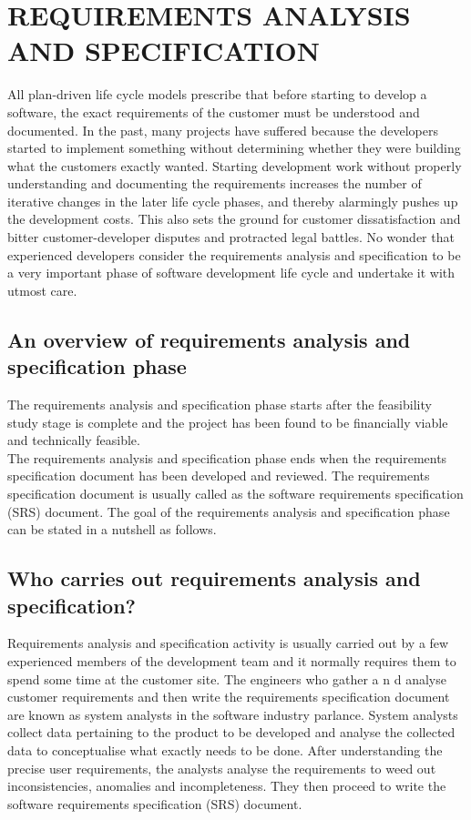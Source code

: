 \documentclass[12pt]{article}
\begin{document}
\section{REQUIREMENTS ANALYSIS AND SPECIFICATION}
All plan-driven life cycle models prescribe that before starting to develop a
software, the exact requirements of the customer must be understood and
documented. In the past, many projects have suffered because the
developers started to implement something without determining whether
they were building what the customers exactly wanted. Starting development
work without properly understanding and documenting the requirements
increases the number of iterative changes in the later life cycle phases, and
thereby alarmingly pushes up the development costs. This also sets the
ground for customer dissatisfaction and bitter customer-developer disputes
and protracted legal battles. No wonder that experienced developers consider
the requirements analysis and specification to be a very important phase of
software development life cycle and undertake it with utmost care.
\subsection{An overview of requirements analysis and specification
phase}
The requirements analysis and specification phase starts after the
feasibility study stage is complete and the project has been found to be
financially viable and technically feasible.\\

The requirements analysis and specification phase ends when the
requirements specification document has been developed and reviewed. The
requirements specification document is usually called as the software
requirements specification (SRS) document. The goal of the requirements
analysis and specification phase can be stated in a nutshell as follows.
\subsection{Who carries out requirements analysis and specification?}
Requirements analysis and specification activity is usually carried out by a
few experienced members of the development team and it normally requires
them to spend some time at the customer site. The engineers who gather
a n d analyse customer requirements and then write the requirements
specification document are known as system analysts in the software industry
parlance. System analysts collect data pertaining to the product to be
developed and analyse the collected data to conceptualise what exactly
needs to be done. After understanding the precise user requirements, the
analysts analyse the requirements to weed out inconsistencies, anomalies
and incompleteness. They then proceed to write the software requirements
specification (SRS) document.
\pagebreak
\end{document}
